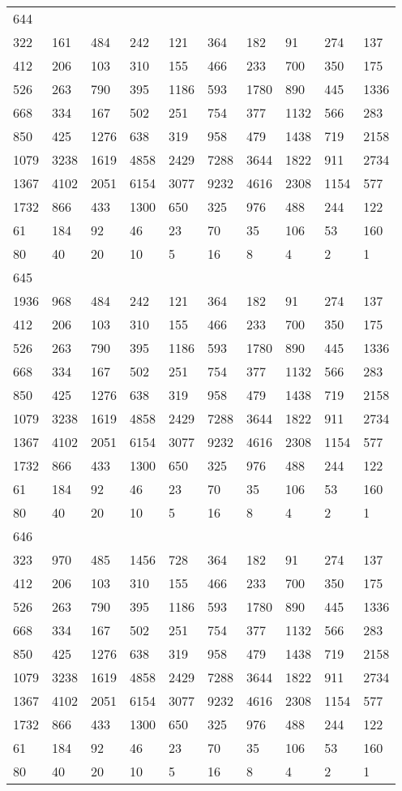 \begin{longtable}{*{10}{l}}
644&&&&&&&&&\\
322& 161& 484& 242& 121& 364& 182& 91& 274& 137\\
412& 206& 103& 310& 155& 466& 233& 700& 350& 175\\
526& 263& 790& 395& 1186& 593& 1780& 890& 445& 1336\\
668& 334& 167& 502& 251& 754& 377& 1132& 566& 283\\
850& 425& 1276& 638& 319& 958& 479& 1438& 719& 2158\\
1079& 3238& 1619& 4858& 2429& 7288& 3644& 1822& 911& 2734\\
1367& 4102& 2051& 6154& 3077& 9232& 4616& 2308& 1154& 577\\
1732& 866& 433& 1300& 650& 325& 976& 488& 244& 122\\
61& 184& 92& 46& 23& 70& 35& 106& 53& 160\\
80& 40& 20& 10& 5& 16& 8& 4& 2& 1\\

645&&&&&&&&&\\
1936& 968& 484& 242& 121& 364& 182& 91& 274& 137\\
412& 206& 103& 310& 155& 466& 233& 700& 350& 175\\
526& 263& 790& 395& 1186& 593& 1780& 890& 445& 1336\\
668& 334& 167& 502& 251& 754& 377& 1132& 566& 283\\
850& 425& 1276& 638& 319& 958& 479& 1438& 719& 2158\\
1079& 3238& 1619& 4858& 2429& 7288& 3644& 1822& 911& 2734\\
1367& 4102& 2051& 6154& 3077& 9232& 4616& 2308& 1154& 577\\
1732& 866& 433& 1300& 650& 325& 976& 488& 244& 122\\
61& 184& 92& 46& 23& 70& 35& 106& 53& 160\\
80& 40& 20& 10& 5& 16& 8& 4& 2& 1\\

646&&&&&&&&&\\
323& 970& 485& 1456& 728& 364& 182& 91& 274& 137\\
412& 206& 103& 310& 155& 466& 233& 700& 350& 175\\
526& 263& 790& 395& 1186& 593& 1780& 890& 445& 1336\\
668& 334& 167& 502& 251& 754& 377& 1132& 566& 283\\
850& 425& 1276& 638& 319& 958& 479& 1438& 719& 2158\\
1079& 3238& 1619& 4858& 2429& 7288& 3644& 1822& 911& 2734\\
1367& 4102& 2051& 6154& 3077& 9232& 4616& 2308& 1154& 577\\
1732& 866& 433& 1300& 650& 325& 976& 488& 244& 122\\
61& 184& 92& 46& 23& 70& 35& 106& 53& 160\\
80& 40& 20& 10& 5& 16& 8& 4& 2& 1\\


\end{longtable}
